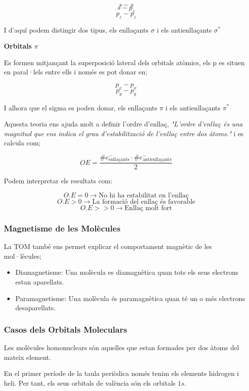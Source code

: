 \documentclass[12pt]{article}
\begin{document}
\[s-s\]
\[s-p_z\]
\[p_z-p_z\]

I d'aquí podem distingir dos tipus, els enllaçants $\sigma$ i els antienllaçants $\sigma^*$

\noindent \textbf{Orbitals $\pi$}

Es formen mitjançant la superposició lateral dels orbitals atòmics, els p es situen en paral·lels entre ells i només es pot donar en;

\[p_x - p_x\]
\[p_y-p_y\]

I alhora que el sigma es poden donar, els enllaçants $\pi$ i els antienllaçants $\pi^*$

Aquesta teoria ens ajuda molt a definir l'ordre d'enllaç, \textit{"L'ordre d'enllaç és una magnitud que ens indica el grau d'estabilització de l'enllaç entre dos àtoms."} i es calcula com;

\[\boxed{OE = \frac{\#e^-_{\text{enllaçants}} \cdot \# e^-_{\text{antienllaçants}}}{2}}\]

Podem interpretar els resultats com:

\[O.E = 0\rightarrow \text{No hi ha estabilitat en l'enllaç}\]
\[O.E > 0 \rightarrow \text{La formació del enllaç és favorable}\]
\[O.E >> 0\rightarrow \text{Enllaç molt fort}\]

\subsubsection{Magnetisme de les Molècules}

La TOM també ens permet explicar el comportament magnètic de les mol·lècules;

\begin{itemize}
    \item Diamagnetisme: Una molècula es diamagnètica quan tots els seus electrons estan aparellats.
    \item Paramagnetisme: Una molècula és paramagnètica quan té un o més electrons desaparellats.
\end{itemize}

\subsubsection{Casos dels Orbitals Moleculars}

\noindent{}

Les molècules homonuclears són aquelles que estan formades per dos
àtoms del mateix element.

En el primer període de la taula periòdica només tenim els elements
hidrogen i heli. Per tant, els seus orbitals de valència són els
orbitals \(1s\).
\end{document}
